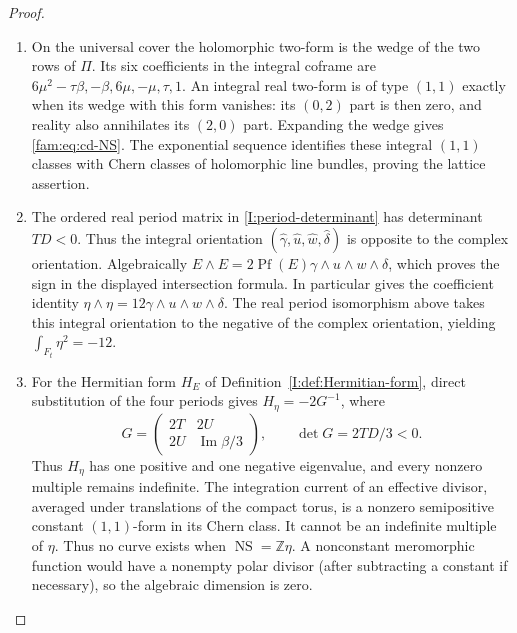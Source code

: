 \begin{proof}
\begin{enumerate}[label=\arabic*.,leftmargin=*]
\item On the universal cover the holomorphic two-form is the wedge of the two
rows of \(\Pi\). Its six coefficients in the integral coframe are
\(6\mu^2-\tau\beta,-\beta,6\mu,-\mu,\tau,1\).
An integral real two-form is of type \((1,1)\) exactly when its wedge
with this form vanishes: its \((0,2)\) part is then zero, and reality
also annihilates its \((2,0)\) part. Expanding the wedge gives
\eqref{fam:eq:cd-NS}. The exponential sequence identifies these integral
\((1,1)\) classes with Chern classes of holomorphic line bundles, proving
the lattice assertion.

\item The ordered real period matrix in \cref{I:period-determinant} has determinant \(TD<0\). Thus the
integral orientation \((\widehat\gamma,\widehat u,\widehat w,
\widehat\delta)\) is opposite to the complex orientation. Algebraically
\(E\wedge E=2\operatorname{Pf}(E)\gamma\wedge u\wedge w\wedge\delta\),
which proves the sign in the displayed intersection formula. In
particular \cite[Lemma~9.4, pp.~66--67]{AC2026} gives the coefficient
identity \(\eta\wedge\eta=12\gamma\wedge u\wedge w\wedge\delta\).
The real period isomorphism above takes this integral orientation to the
negative of the complex orientation, yielding
\(\int_{F_t}\eta^2=-12\).

\item For the Hermitian form $H_E$ of Definition~\ref{I:def:Hermitian-form}, direct
substitution of the four periods gives $H_\eta=-2G^{-1}$, where
\[
 G=\begin{pmatrix}2T&2U\\2U&\operatorname{Im}\beta/3\end{pmatrix},
 \qquad \det G=2TD/3<0.
\]
Thus $H_\eta$ has one positive and one negative eigenvalue, and every
nonzero multiple remains indefinite. The integration
current of an effective divisor, averaged under translations of the
compact torus, is a nonzero semipositive constant \((1,1)\)-form in its
Chern class. It cannot be an indefinite multiple of \(\eta\).
Thus no curve exists when \(\operatorname{NS}=\mathbb Z\eta\).
A nonconstant meromorphic function would have a nonempty polar divisor
(after subtracting a constant if necessary), so the algebraic dimension
is zero.
\end{enumerate}
\end{proof}